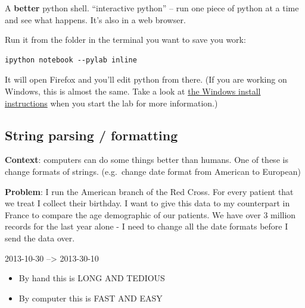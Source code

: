 \documentclass[letterpaper,10pt,english]{/usr/local/lib/python2.7/dist-packages/sphinx/texinputs/sphinxhowto}
\begin{document}
A \textbf{better} python shell. ``interactive python'' -- run one piece
of python at a time and see what happens. It's also in a web browser.

Run it from the folder in the terminal you want to save you work:

\begin{verbatim}
ipython notebook --pylab inline
\end{verbatim}
It will open Firefox and you'll edit python from there. (If you are
working on Windows, this is almost the same. Take a look at
\href{InstallipythonWindows.ipynb}{the Windows install instructions}
when you start the lab for more information.)\subsection{String parsing / formatting}

\textbf{Context}: computers can do some things better than humans. One
of these is change formats of strings. (e.g.~change date format from
American to European)

\textbf{Problem}: I run the American branch of the Red Cross. For every
patient that we treat I collect their birthday. I want to give this data
to my counterpart in France to compare the age demographic of our
patients. We have over 3 million records for the last year alone - I
need to change all the date formats before I send the data over.

2013-10-30 --\textgreater{} 2013-30-10

\begin{itemize}
\item
  By hand this is LONG AND TEDIOUS
\item
  By computer this is FAST AND EASY
\end{itemize}

\end{document}
